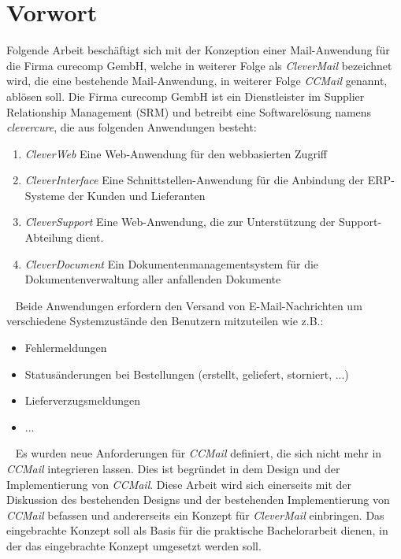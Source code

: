 \chapter{Vorwort} 	%
Folgende Arbeit beschäftigt sich mit der Konzeption einer Mail-Anwendung für die Firma curecomp GembH, welche in weiterer Folge als \emph{CleverMail}\newline
bezeichnet wird, die eine bestehende Mail-Anwendung, in weiterer Folge\newline
\emph{CCMail} genannt, ablösen soll. Die  Firma curecomp GembH ist ein Dienstleister im Supplier Relationship Management (SRM) und betreibt eine Softwarelösung namens \emph{clevercure}, die aus folgenden Anwendungen besteht:\newline
\begin{enumerate}
	\item\emph{CleverWeb}
	\newline
	Eine Web-Anwendung für den webbasierten Zugriff
	\item\emph{CleverInterface}
	\newline
	Eine Schnittstellen-Anwendung für die Anbindung der ERP-Systeme der Kunden und Lieferanten
	\item\emph{CleverSupport}
	\newline
	Eine Web-Anwendung, die zur Unterstützung der Support-Abteilung dient.
	\item\emph{CleverDocument}
	\newline
	Ein Dokumentenmanagementsystem für die Dokumentenverwaltung aller anfallenden Dokumente 
\end{enumerate} 
\ \newline
Beide Anwendungen erfordern den Versand von E-Mail-Nachrichten um verschiedene Systemzustände den Benutzern mitzuteilen wie z.B.:
\begin{itemize}
	\item Fehlermeldungen
	\item Statusänderungen bei Bestellungen (erstellt, geliefert, storniert, ...)
	\item Lieferverzugsmeldungen
	\item ...
\end{itemize}
\ \newline
Es wurden neue Anforderungen für \emph{CCMail}
definiert, die sich nicht mehr in \emph{CCMail} integrieren lassen. Dies ist begründet in dem Design und der Implementierung von \emph{CCMail}.
\newline\newline
Diese Arbeit wird sich einerseits mit der Diskussion des bestehenden Designs und der bestehenden Implementierung von \emph{CCMail} befassen und andererseits ein Konzept für 
\emph{CleverMail} einbringen. Das eingebrachte Konzept soll als Basis für die praktische Bachelorarbeit dienen, in der das eingebrachte Konzept umgesetzt werden soll.
